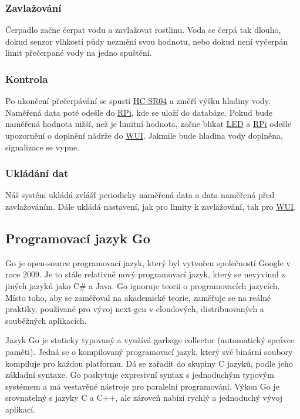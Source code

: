 \documentclass[czech,12pt,a4paper]{article}
\begin{document}
\subsubsection{Zavlažování}

Čerpadlo začne čerpat vodu a zavlažovat rostlinu. Voda se čerpá tak dlouho, dokud senzor vlhkosti půdy nezmění svou hodnotu, nebo dokud není vyčerpán limit přečerpané vody na jedno spuštění.

\subsubsection{Kontrola}

Po ukončení přečerpávání se spustí \underline{\ac{HC-SR04}} a změří výšku hladiny vody. Naměřená data poté odešle do \underline{\ac{RPi}}, kde se uloží do databáze. Pokud bude naměřená hodnota nižší, než je limitní hodnota, začne blikat \underline{\ac{LED}} a \underline{\ac{RPi}} odešle upozornění o doplnění nádrže do \underline{\ac{WUI}}. Jakmile bude hladina vody doplněna, signalizace se vypne.

\subsubsection{Ukládání dat}

Náš systém ukládá zvlášť periodicky naměřená data a data naměřená před zavlažováním. Dále ukládá nastavení, jak pro limity k zavlažování, tak pro \underline{\ac{WUI}}.

\subsection{Programovací jazyk Go}

Go je open-source programovací jazyk, který byl vytvořen společností Google v roce 2009. Je to stále relativně nový programovací jazyk, který se nevyvinul z jiných jazyků jako C\# a Java. Go ignoruje teorii o programovacích jazycích. Místo toho, aby se zaměřoval na akademické teorie, zaměřuje se na reálné praktiky, používané pro vývoj next-gen v cloudových, distribuovaných a souběžných aplikacích.

Jazyk Go je staticky typovaný a využívá garbage collector (automatický správce paměti). Jedná se o kompilovaný programovací jazyk, který své binární soubory kompiluje pro každou platformu. Dá se zařadit do skupiny C jazyků, podle jeho základní syntaxe. Go poskytuje expresivní syntax s jednoduchým typovým systémem a má vestavěné nástroje pro paralelní programování. Výkon Go je srovnatelný s jazyky C a C++, ale zároveň nabízí rychlý a jednoduchý vývoj aplikací.
\end{document}
